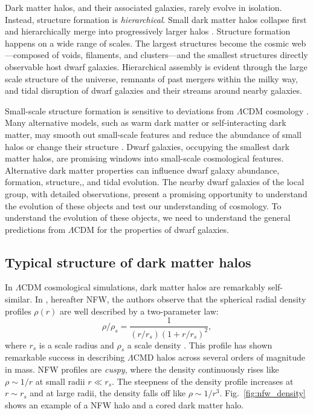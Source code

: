 Dark matter halos, and their associated galaxies, rarely evolve in
isolation. Instead, structure formation is \emph{hierarchical}. Small
dark matter halos collapse first and hierarchically merge into
progressively larger halos
\citep[e.g.,][]{blumenthal+1984, white+rees1978, white+frenk1991}.
Structure formation happens on a wide range of scales. The largest
structures become the cosmic web---composed of voids, filaments, and
clusters---and the smallest structures directly observable host dwarf
galaxies. Hierarchical assembly is evident through the large scale
structure of the universe, remnants of past mergers within the milky
way, and tidal disruption of dwarf galaxies and their streams around
nearby galaxies.

Small-scale structure formation is sensitive to deviations from
\(\Lambda\)CDM cosmology \citep[e.g.,][]{bechtol+2022}. Many alternative
models, such as warm dark matter or self-interacting dark matter, may
smooth out small-scale features and reduce the abundance of small halos
or change their structure \citep[e.g.,][]{lovell+2014}. Dwarf galaxies,
occupying the smallest dark matter halos, are promising windows into
small-scale cosmological features. Alternative dark matter properties
can influence dwarf galaxy abundance, formation, structure,, and tidal
evolution. The nearby dwarf galaxies of the local group, with detailed
observations, present a promising opportunity to understand the
evolution of these objects and test our understanding of cosmology. To
understand the evolution of these objects, we need to understand the
general predictions from \(\Lambda\)CDM for the properties of dwarf
galaxies.

\subsection{Typical structure of dark matter
halos}\label{typical-structure-of-dark-matter-halos}

In \(\Lambda\)CDM cosmological simulations, dark matter halos are
remarkably self-similar. In \citet{NFW1996, NFW1997}, hereafter NFW, the
authors observe that the spherical radial density profiles \(\rho(r)\)
are well described by a two-parameter law: \begin{equation}{
\rho/\rho_s= \frac{1}{(r/r_s)(1+r/r_s)^2},
}\end{equation} where \(r_s\) is a scale radius and \(\rho_s\) a scale
density . This profile has shown remarkable success in describing
\(\Lambda\)CMD halos across several orders of magnitude in mass. NFW
profiles are \emph{cuspy}, where the density continuously rises like
\(\rho \sim 1/r\) at small radii \(r \ll r_s\). The steepness of the
density profile increases at \(r \sim r_s\) and at large radii, the
density falls off like \(\rho \sim 1/r^3\). Fig.~\ref{fig:nfw_density}
shows an example of a NFW halo and a cored dark matter halo.

